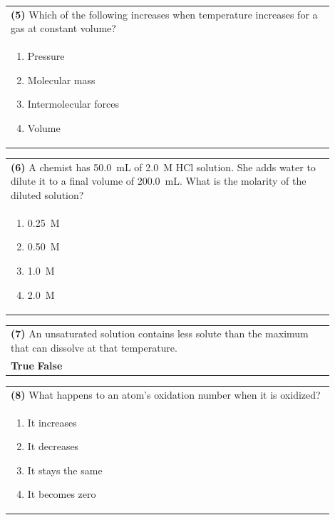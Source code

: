 \documentclass{article}
\begin{document}
\noindent\begin{tabular}{|p{0.9\linewidth}|}
\hline
\textbf{(5)} Which of the following increases when temperature increases for a gas at constant volume?\\[0.2cm]

\begin{minipage}[t]{0.85\linewidth}
\begin{enumerate}[label=\alph*.]
\item Pressure
\item Molecular mass
\item Intermolecular forces
\item Volume
\end{enumerate}
\end{minipage}\\[0.2cm]
\hline
\end{tabular}

\noindent\begin{tabular}{|p{0.9\linewidth}|}
\hline
\textbf{(6)} A chemist has 50.0~mL of 2.0~M HCl solution. She adds water to dilute it to a final volume of 200.0~mL. What is the molarity of the diluted solution?\\[0.2cm]
\begin{minipage}[t]{0.85\linewidth}
\begin{enumerate}[label=\alph*.]
\item 0.25~M
\item 0.50~M
\item 1.0~M
\item 2.0~M
\end{enumerate}
\end{minipage}\\[0.2cm]
\hline
\end{tabular}

\noindent\begin{tabular}{|p{0.9\linewidth}|}
\hline
\textbf{(7)} An unsaturated solution contains less solute than the maximum that can dissolve at that temperature.\\[0.2cm]
\textbf{True} \hspace{1cm} \textbf{False}\\[0.2cm]
\hline
\end{tabular}

\noindent\begin{tabular}{|p{0.9\linewidth}|}
\hline
\textbf{(8)} What happens to an atom's oxidation number when it is oxidized?\\[0.2cm]
\begin{minipage}[t]{0.85\linewidth}
\begin{enumerate}[label=\alph*.]
\item It increases
\item It decreases
\item It stays the same
\item It becomes zero
\end{enumerate}
\end{minipage}\\[0.2cm]
\hline
\end{tabular}
\end{document}
